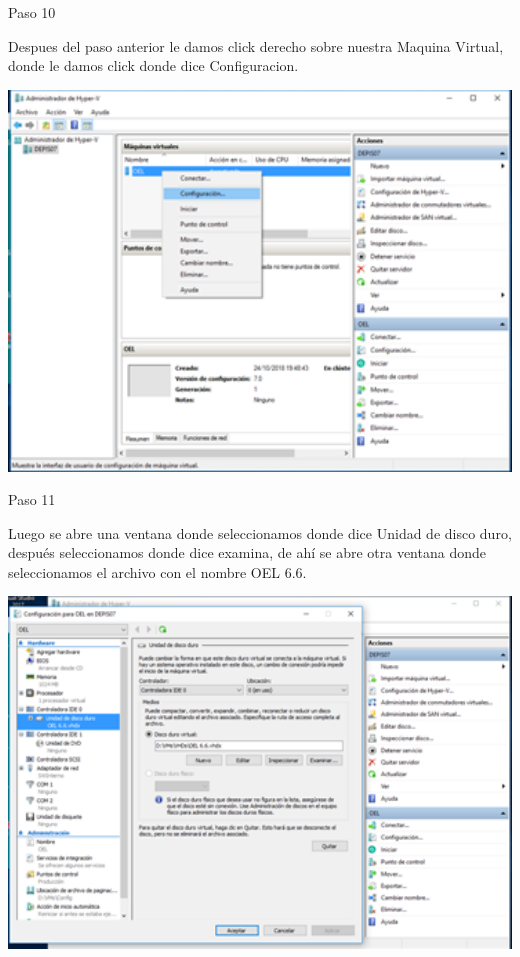 \begin{itemize}
\begin{center}
    Paso 10
\end{center}


    Despues del paso anterior le damos click derecho sobre nuestra Maquina Virtual, donde le damos click donde dice Configuracion.\\
	\begin{center}
	\includegraphics[width=15cm]{./Imagenes/imagen10} 
	\end{center}

\end{itemize} 

\begin{itemize}
\begin{center}
    Paso 11
\end{center}


    Luego se abre una ventana donde seleccionamos donde dice Unidad de disco duro, después seleccionamos donde dice examina, de ahí se abre otra ventana donde seleccionamos el archivo con el nombre OEL 6.6.\\
	\begin{center}
	\includegraphics[width=15cm]{./Imagenes/imagen11} 
	\end{center}

  \end{itemize}
  
  

